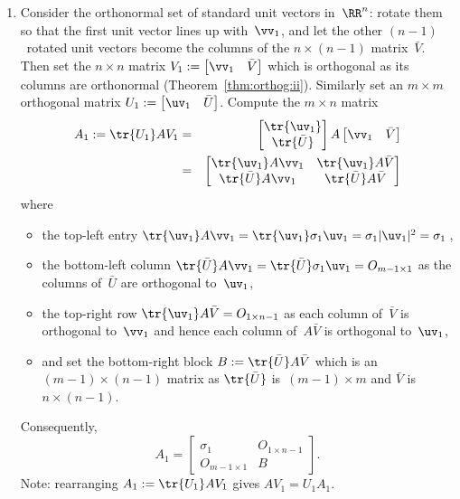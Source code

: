 \begin{enumerate}
\item Consider the orthonormal set of standard unit vectors in~\(\RR^n\): rotate them so that the first unit vector lines up with~\(\vv_1\), and let the other \((n-1)\)~rotated unit vectors become the columns of the \(n\times(n-1)\) matrix~\(\bar V\).
Then set the \(n\times n\) matrix
\(V_1:=\begin{bmatrix}\vv_1&\bar V\end{bmatrix}\) which is orthogonal as its columns are orthonormal (Theorem~\ref{thm:orthog:ii}).
Similarly set an \(m\times m\) orthogonal matrix
\(U_1:=\begin{bmatrix}\uv_1&\bar U\end{bmatrix}\).
Compute the \(m\times n\) matrix
\begin{eqnarray*}
A_1:=\tr{U_1}AV_1
&=&\begin{bmatrix} \tr{\uv_1}\\\tr{\bar U} \end{bmatrix}A
\begin{bmatrix} \vv_1 &\bar V \end{bmatrix}
\\&=&\begin{bmatrix} \tr{\uv_1}A\vv_1 & \tr{\uv_1}A\bar V
\\\tr{\bar U}A\vv_1&\tr{\bar U}A\bar V \end{bmatrix}
\end{eqnarray*}
where
\begin{itemize}
\item the top-left entry \(\tr{\uv_1}A\vv_1=\tr{\uv_1}\sigma_1\uv_1=\sigma_1|\uv_1|^2=\sigma_1\)\,,
\item the bottom-left column \(\tr{\bar U}A\vv_1=\tr{\bar U}\sigma_1\uv_1=O_{m-1\times 1}\) as the columns of~\(\bar U\) are orthogonal to~\(\uv_1\),
\item the top-right row \(\tr{\uv_1}A\bar V=O_{1\times n-1}\) as each column of~\(\bar V\) is orthogonal to~\(\vv_1\) and hence each column of~\(A\bar V\) is orthogonal to~\(\uv_1\),
\item and set the bottom-right block \(B:=\tr{\bar U}A\bar V\) which is an \((m-1)\times(n-1)\) matrix as \(\tr{\bar U}\) is~\((m-1)\times m\) and \(\bar V\) is \(n\times(n-1)\).
\end{itemize}
Consequently, 
\begin{equation*}
A_1=\begin{bmatrix} \sigma_1&O_{1\times n-1}
\\O_{m-1\times 1}&B \end{bmatrix}.
\end{equation*}%
Note: rearranging \(A_1:=\tr{U_1}AV_1\) gives \(AV_1=U_1A_1\).


\end{enumerate}
